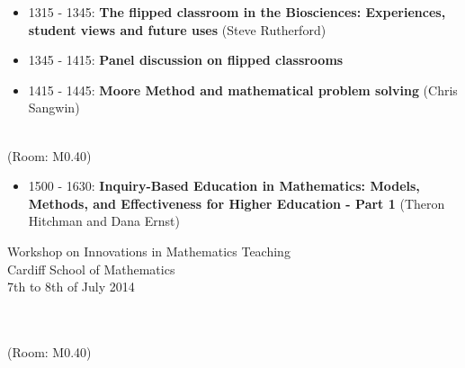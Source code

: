 \documentclass[a4paper]{article}
\begin{document}
\begin{itemize}
    \item 1315 - 1345: \textbf{The flipped classroom in the Biosciences: Experiences, student views and future uses} (Steve Rutherford)
    \item 1345 - 1415: \textbf{Panel discussion on flipped classrooms}
    \item 1415 - 1445: \textbf{Moore Method and mathematical problem solving} (Chris Sangwin)
\end{itemize}

\vspace{1cm}

\begin{center}
    \\
    \tiny{(Room: M0.40)}
\end{center}

\begin{itemize}
    \item 1500 - 1630: \textbf{Inquiry-Based Education in Mathematics: Models, Methods, and Effectiveness for Higher Education - Part 1} (Theron Hitchman and Dana Ernst)
\end{itemize}

\vspace{1cm}

\begin{center}
\end{center}



\newpage

\begin{center}
    {\Huge Workshop on Innovations in Mathematics Teaching}\\
    {\tiny Cardiff School of Mathematics}\\
    {\tiny 7th to 8th of July 2014}\\
    \vspace{1cm}
    {}\\
\end{center}

\vspace{1cm}

\begin{center}
    \\
    \tiny{(Room: M0.40)}
\end{center}
\end{document}

